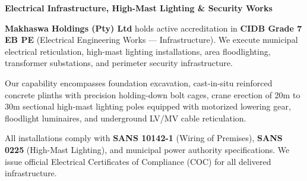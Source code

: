 \documentclass[a4paper,11pt]{article}
\begin{document}
\noindent
\begin{minipage}[t]{0.62\textwidth}
    \vspace{0pt}
    {\large\bfseries\color{mhnavy} Electrical Infrastructure, High-Mast Lighting \& Security Works}
    \vspace{0.12cm}

    {\fontsize{9pt}{13pt}\selectfont\color{mhtext}
    \textbf{Makhaswa Holdings (Pty) Ltd} holds active accreditation in \textbf{CIDB Grade 7 EB PE} (Electrical Engineering Works --- Infrastructure). We execute municipal electrical reticulation, high-mast lighting installations, area floodlighting, transformer substations, and perimeter security infrastructure.
    }

    \vspace{0.22cm}

    {\fontsize{9pt}{13pt}\selectfont\color{mhtext}
    Our capability encompasses foundation excavation, cast-in-situ reinforced concrete plinths with precision holding-down bolt cages, crane erection of 20m to 30m sectional high-mast lighting poles equipped with motorized lowering gear, floodlight luminaires, and underground LV/MV cable reticulation.
    }

    \vspace{0.22cm}

    {\fontsize{9pt}{13pt}\selectfont\color{mhtext}
    All installations comply with \textbf{SANS 10142-1} (Wiring of Premises), \textbf{SANS 0225} (High-Mast Lighting), and municipal power authority specifications. We issue official Electrical Certificates of Compliance (COC) for all delivered infrastructure.
    }
\end{minipage}
\hfill
\end{document}
